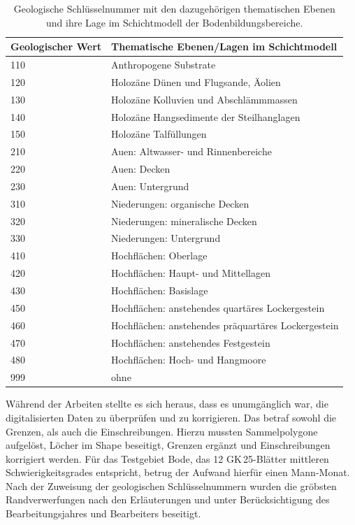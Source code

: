 \begin{table}[p]
  \centering
  \caption{Geologische Schlüsselnummer mit den dazugehörigen thematischen Ebenen und ihre Lage im Schichtmodell der Bodenbildungsbereiche.}\label{tab:gk2}
    \begin{tabular}{ll}
    \toprule
    \textbf{Geologischer Wert} & \textbf{Thematische Ebenen/Lagen im Schichtmodell}\\
    \midrule
    110   & Anthropogene Substrate \\
    \midrule
    120   & Holozäne Dünen und Flugsande, Äolien \\
    \midrule
    130   & Holozäne Kolluvien und Abschlämmmassen \\
    \midrule
    140   & Holozäne Hangsedimente der Steilhanglagen \\
    \midrule
    150   & Holozäne Talfüllungen \\
    \midrule
    210   & Auen: Altwasser- und Rinnenbereiche \\
    \midrule
    220   & Auen: Decken \\
    \midrule
    230   & Auen: Untergrund \\
    \midrule
    310   & Niederungen: organische Decken \\
    \midrule
    320   & Niederungen: mineralische Decken \\
    \midrule
    330   & Niederungen: Untergrund \\
    \midrule
    410   & Hochflächen: Oberlage \\
    \midrule
    420   & Hochflächen: Haupt- und Mittellagen \\
    \midrule
    430   & Hochflächen: Basislage \\
    \midrule
    450   & Hochflächen: anstehendes quartäres Lockergestein \\
    \midrule
    460   & Hochflächen: anstehendes präquartäres Lockergestein \\
    \midrule
    470   & Hochflächen: anstehendes Festgestein \\
    \midrule
    480   & Hochflächen: Hoch- und Hangmoore \\
    \midrule
    999   & ohne \\
    \bottomrule
    \end{tabular}%
  \label{tab:addlabel}%
\end{table}%


Während der Arbeiten stellte es sich heraus, dass es unumgänglich war, die digitalisierten Daten zu überprüfen und zu korrigieren. Das betraf sowohl die Grenzen, als auch die Einschreibungen. Hierzu mussten Sammelpolygone aufgelöst, Löcher im Shape beseitigt, Grenzen ergänzt und Einschreibungen korrigiert werden. Für das Testgebiet Bode, das 12 GK\,25-Blätter mittleren Schwierigkeitsgrades entspricht, betrug der Aufwand hierfür einen Mann-Monat. Nach der Zuweisung der geologischen Schlüsselnummern wurden die gröbsten Randverwerfungen nach den Erläuterungen und unter Berücksichtigung des Bearbeitungsjahres und Bearbeiters beseitigt.\

